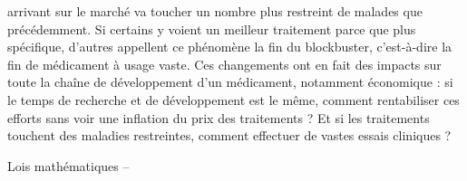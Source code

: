 \begin{rightbubbles}
arrivant sur le marché va toucher un nombre plus restreint de malades que précédemment. Si certains y voient un meilleur traitement parce que plus spécifique, d’autres appellent ce phénomène la fin du blockbuster, c’est-à-dire la fin de médicament à usage vaste. Ces changements ont en fait des impacts sur toute la chaîne de développement d’un médicament, notamment économique : si le temps de recherche et de développement est le même, comment rentabiliser ces efforts sans voir une inflation du prix des traitements ? Et si les traitements touchent des maladies restreintes, comment effectuer de vastes essais cliniques ?\\
\end{rightbubbles}

\begin{leftbubbles}
Lois mathématiques --\\
\end{leftbubbles}